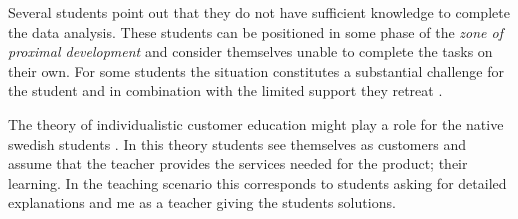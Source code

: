 \documentclass[]{article}
\begin{document}
Several students point out that they do not have sufficient knowledge to complete the data analysis.
These students can be positioned in some phase of the {\it zone of proximal development} \cite{saljo, vygotski} and consider themselves unable to complete the tasks on their own.
For some students the situation constitutes a substantial challenge for the student and in combination with the limited support they retreat \cite{daloz}.

The theory of individualistic customer education might play a role for the native swedish students \cite{kund}.
In this theory students see themselves as customers and assume that the teacher provides the services needed for the product; their learning.
In the teaching scenario this corresponds to students asking for detailed explanations and me as a teacher giving the students solutions.
\end{document}
